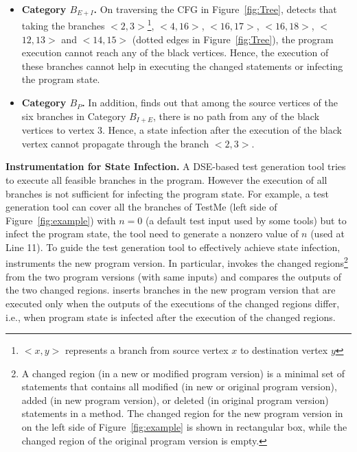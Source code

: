\begin{itemize}
\vspace{-1ex}
\item \textbf{Category $B_{E+I}$.} On traversing the CFG in Figure~\ref{fig:Tree},  detects that taking the branches $<$$2, 3$$>$\footnote{\scriptsize{$<$$x,y$$>$ represents a branch from source vertex $x$ to destination vertex $y$}}, $<$$4, 16$$>$, $<$$16, 17$$>$, $<$$16, 18$$>$, $<$$12, 13$$>$ and $<$$14, 15$$>$ (dotted edges in Figure~\ref{fig:Tree}), the program execution cannot reach any of the black vertices. Hence, the execution of these branches cannot help in executing the changed statements or infecting the program state. \\ 
\vspace{-1ex} 
\item \textbf{Category $B_{P}$.} In addition,  finds out that 
among the source vertices of the six branches in Category $B_{I+E}$, there is no path from any of the 
black vertices to vertex 3. Hence, a state infection after the execution of the black vertex 
cannot propagate through the branch $<2,3>$.
\end{itemize}
\vspace{-0.2cm}
\textbf{Instrumentation for State Infection.}
A DSE-based test generation tool tries to execute all feasible branches in the program. However the execution of 
all branches is not sufficient for infecting the program state. For example, 
a test generation tool can 
cover all the branches of \CodeIn{}TestMe (left side of Figure~\ref{fig:example}) with $n=0$ (a default test input used by some tools) but to infect the program state, the tool
need to generate a nonzero value of $n$ (used at Line 11).
To guide the test generation tool to effectively achieve state infection,
 instruments the new program version.
In particular,  invokes the changed regions\footnote{\scriptsize{A changed region (in a new or modified program version) is a minimal set of statements that contains all modified (in new or original program version), added (in new program version), or deleted (in original program version) statements in a method. The changed region for the new program version in  on the left side of Figure~\ref{fig:example} is shown in rectangular box, while the changed region of the original program version is empty.}} 
from the two program versions (with same inputs) and 
compares the outputs of the two changed regions. 
 inserts branches in the new program version that are executed only 
when the outputs of the executions of the changed regions differ, i.e., when program
state is infected after the execution of the changed regions.

